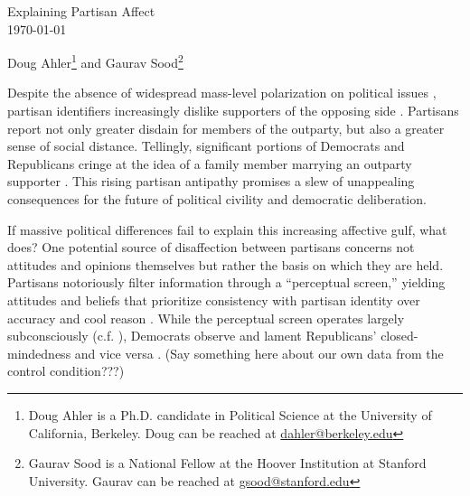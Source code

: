 \documentclass[12pt]{article}
\begin{document}
\doublespacing
\vspace{2cm}

\begin{center}
Explaining Partisan Affect\\
\vspace{2cm}
\today\\\vspace{2cm}

Doug Ahler\footnote{Doug Ahler is a Ph.D. candidate in Political Science at the
University of California, Berkeley. Doug can be reached at
\href{mailto:dahler@berkeley.edu}{dahler@berkeley.edu}} and Gaurav
Sood\footnote{Gaurav Sood is a National Fellow at the Hoover Institution at
Stanford University. Gaurav can be reached at
\href{mailto:gsood@stanford.edu}{gsood@stanford.edu}}

\end{center}

\setcounter{page}{0}
\thispagestyle{empty}
\thispagestyle{empty}

\newpage
\setcounter{footnote}{1}


\begin{comment}
	sweaver(paste0(basedir, "xperceive/partisanResponse"), "presponse")
\end{comment}
\newpage

\doublespacing
Despite the absence of widespread mass-level polarization on political issues \citep{fiorina2012}, partisan identifiers increasingly dislike supporters of the opposing side \citep{iyengar2012, iyengar2013}. Partisans report not only greater disdain for members of the outparty, but also a greater sense of social distance. Tellingly, significant portions of Democrats and Republicans cringe at the idea of a family member marrying an outparty supporter \citep{iyengar2012}. This rising partisan antipathy promises a slew of unappealing consequences for the future of political civility and democratic deliberation. 

If massive political differences fail to explain this increasing affective gulf, what does? One potential source of disaffection between partisans concerns not attitudes and opinions themselves but rather the basis on which they are held. Partisans notoriously filter information through a ``perceptual screen,'' yielding attitudes and beliefs that prioritize consistency with partisan identity over accuracy and cool reason \citep{TAV,TAVR,Bartels2002}. While the perceptual screen operates largely subconsciously (c.f. \citet{BullockEtAl2013}), Democrats observe and lament Republicans' closed-mindedness and vice versa \citep{Haidt2011}. (Say something here about our own data from the control condition???)
\end{document}

